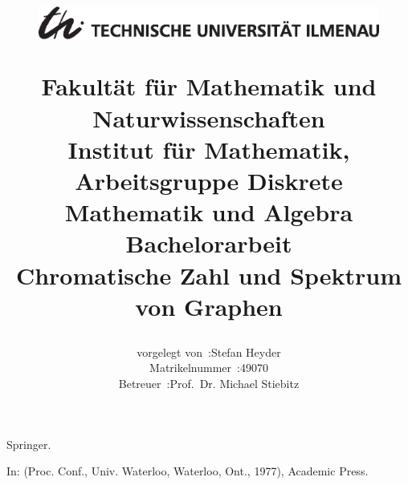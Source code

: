 \documentclass[a4paper,11pt]{article}
\begin{document}
\renewcommand{\baselinestretch}{1.5}\normalsize

\title{
    \begin{figure}[htbp]
        \vspace{-48pt}
        \centering
        \includegraphics[height=36pt]{TU-Logo.eps}
    \end{figure}\vspace{-16pt}
    \Large Fakultät für Mathematik und Naturwissenschaften\\
    \vspace{5pt}
    \small Institut für Mathematik, Arbeitsgruppe Diskrete Mathematik und Algebra\\
    \vspace{100pt}
  \Huge {\bf Bachelorarbeit}\\
  \vspace{90pt}
    \huge {\bf Chromatische Zahl und Spektrum von Graphen}\\
    \vspace{100pt}
}

\author{
    \begin{tabular}{rl}
      vorgelegt von~:& Stefan Heyder\\
     Matrikelnummer~:& 49070\\
           Betreuer~:& Prof.~Dr. Michael Stiebitz
\end{tabular}
    \vspace{20pt}
}
\date{\datum}
\maketitle
\thispagestyle{empty}


\newpage
\tableofcontents
\thispagestyle{empty}
\newpage
{}




%



\newpage
{}

\begin{thebibliography}{1}

  
  

   Springer.

 
In:  (Proc. Conf., Univ. Waterloo, Waterloo, Ont., 1977), 
Academic Press.

\end{thebibliography}
\end{document}
